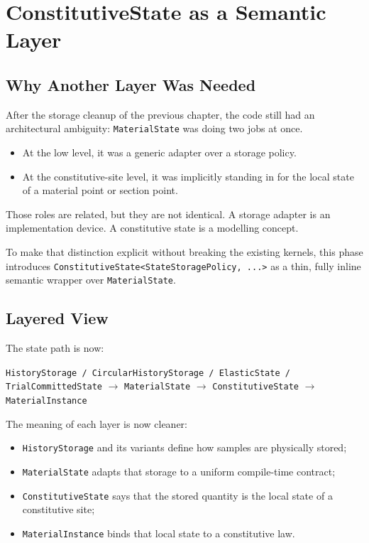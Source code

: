 \chapter{ConstitutiveState as a Semantic Layer}

\section{Why Another Layer Was Needed}

After the storage cleanup of the previous chapter, the code still had an
architectural ambiguity: \texttt{MaterialState} was doing two jobs at once.

\begin{itemize}
  \item At the low level, it was a generic adapter over a storage policy.
  \item At the constitutive-site level, it was implicitly standing in for the
        local state of a material point or section point.
\end{itemize}

Those roles are related, but they are not identical.  A storage adapter is an
implementation device.  A constitutive state is a modelling concept.

To make that distinction explicit without breaking the existing kernels, this
phase introduces \texttt{ConstitutiveState<StateStoragePolicy, ...>} as a thin,
fully inline semantic wrapper over \texttt{MaterialState}.

\section{Layered View}

The state path is now:

\begin{center}
\texttt{HistoryStorage / CircularHistoryStorage / ElasticState / TrialCommittedState}
$\rightarrow$
\texttt{MaterialState}
$\rightarrow$
\texttt{ConstitutiveState}
$\rightarrow$
\texttt{MaterialInstance}
\end{center}

The meaning of each layer is now cleaner:

\begin{itemize}
  \item \texttt{HistoryStorage} and its variants define how samples are
        physically stored;
  \item \texttt{MaterialState} adapts that storage to a uniform compile-time
        contract;
  \item \texttt{ConstitutiveState} says that the stored quantity is the local
        state of a constitutive site;
  \item \texttt{MaterialInstance} binds that local state to a constitutive law.
\end{itemize}

